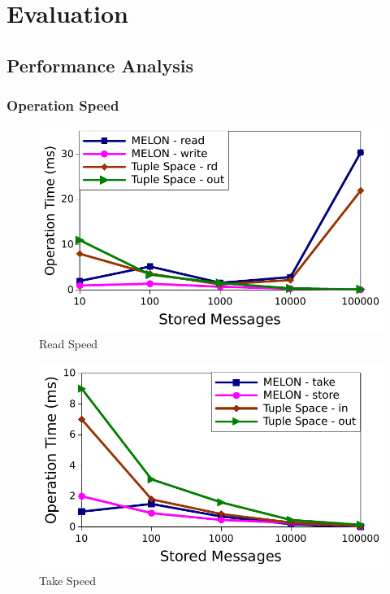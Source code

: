 \chapter{Evaluation}\label{chapter:evaluation}

\section{Performance Analysis}

\subsection{Operation Speed}

\begin{figure}
\centering
\includegraphics[width = \linewidth, clip, trim = 0px 0px 0px 0px]{figures/read_speed.pdf}
\caption{Read Speed}
\label{fig:readspeed}
\end{figure}

\begin{figure}
\centering
\includegraphics[width = \linewidth, clip, trim = 0px 0px 0px 0px]{figures/in_speed.pdf}
\caption{Take Speed}
\label{fig:takespeed}
\end{figure}

